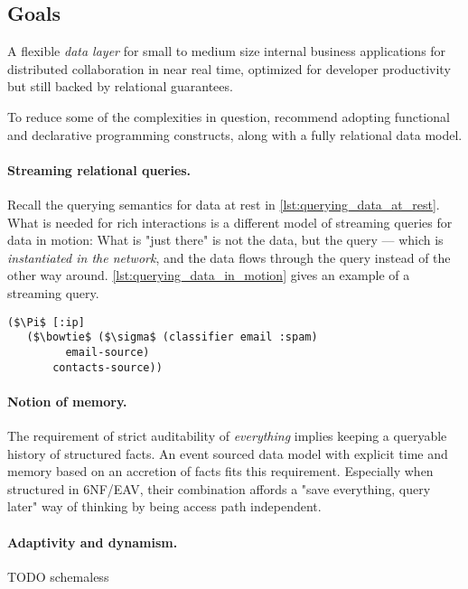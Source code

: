 \subsection{Goals}

A flexible \emph{data layer} for small to medium size internal business applications for distributed collaboration in near real time, optimized for developer productivity but still backed by relational guarantees.

To reduce some of the complexities in question, \cite{tarpit} recommend adopting functional and declarative programming constructs, along with a fully relational data model.

\paragraph{Streaming relational queries.}
Recall the querying semantics for data at rest in \autoref{lst:querying_data_at_rest}. What is needed for rich interactions is a different model of streaming queries for data in motion: What is "just there" is not the data, but the query — which is \emph{instantiated in the network}, and the data flows through the query instead of the other way around. \autoref{lst:querying_data_in_motion} gives an example of a streaming query.

\begin{lstlisting}[label={lst:querying_data_in_motion},morekeywords={email-source,contacts-source},caption=Querying data in motion \cite{alvaro2015isee}]
($\Pi$ [:ip]
   ($\bowtie$ ($\sigma$ (classifier email :spam)
         email-source)
       contacts-source))
\end{lstlisting}


\paragraph{Notion of memory.} The requirement of strict auditability of \emph{everything} implies keeping a queryable history of structured facts. An event sourced data model with explicit time and memory based on an accretion of facts fits this requirement. Especially when structured in 6NF/EAV, their combination affords a "save everything, query later" way of thinking by being access path independent.

\paragraph{Adaptivity and dynamism.}
TODO schemaless


